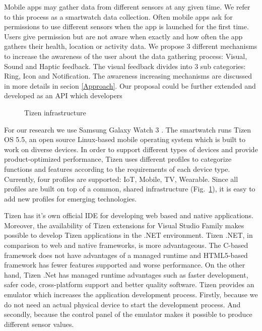 \documentclass[conference, a4paper, 10pt, twocolumn]{IEEEtran}
\begin{document}
Mobile apps may gather data from different sensors at any given time. We refer to this process as a smartwatch data collection. Often mobile apps ask for permissions to use different sensors when the app is launched for the first time. Users give permission but are not aware when exactly and how often the app gathers their health, location or activity data. We propose 3 different mechanisms to increase the awareness of the user about the data gathering process: Visual, Sound and Haptic feedback. The visual feedback divides into 3 sub categories: Ring, Icon and Notification. The awareness increasing mechanisms are discussed in more details in secion \ref{Approach}. Our proposal could be further extended and developed as an API which developers 

\begin{figure}[t]
\caption{Tizen infrastructure}
\label{fig:tizen}
\end{figure}

For our research we use Samsung Galaxy Watch 3 \cite{galaxyWatch3}. The smartwatch runs Tizen OS 5.5\cite{tizenOS}, an open source Linux-based mobile operating system which is built to work on diverse devices. In order to support different types of devices and provide product-optimized performance, Tizen uses different profiles to categorize functions and features according to the requirements of each device type. Currently, four profiles are supported: IoT, Mobile, TV, Wearable. Since all profiles are built on top of a common, shared infrastructure (Fig.~\ref{fig:tizen}), it is easy to add new profiles for emerging technologies. 

Tizen has it's own official IDE for developing web based and native applications. Moreover, the availability of Tizen extensions for Visual Studio Family makes possible to develop Tizen applications in the .NET environment. Tizen .NET, in comparison to web and native frameworks, is more advantageous. The C-based framework does not have advantages of a managed runtime and HTML5-based framework has fewer features supported and worse performance. On the other hand, Tizen .Net has managed runtime advantages such as faster development, safer code, cross-platform support and better quality software. Tizen provides an emulator which increases the application development process. Firstly, because we do not need an actual physical device to start the development process. And secondly, because the control panel of the emulator makes it possible to produce different sensor values.\cite{tizen}
\end{document}
